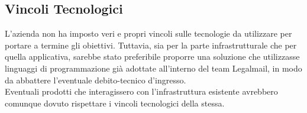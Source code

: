 \subsection{Vincoli Tecnologici}
L'azienda non ha imposto veri e propri vincoli sulle tecnologie da utilizzare per portare a termine gli obiettivi. Tuttavia, sia per la parte infrastrutturale che per quella applicativa, sarebbe stato preferibile proporre una soluzione che utilizzasse linguaggi di programmazione già adottate all'interno del team Legalmail, in modo da abbattere l'eventuale \gls{debito-tecnico} d'ingresso. \\
Eventuali prodotti che interagissero con l'infrastruttura esistente avrebbero comunque dovuto rispettare i vincoli tecnologici della stessa. 
